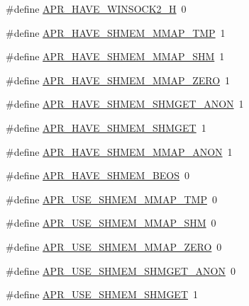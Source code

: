 \begin{DoxyCompactItemize}
\item 
\#define \hyperlink{group__apr__platform_ga46a930f2ecfa34bfa627a8f18532bceb}{A\+P\+R\+\_\+\+H\+A\+V\+E\+\_\+\+W\+I\+N\+S\+O\+C\+K2\+\_\+H}~0
\item 
\#define \hyperlink{group__apr__platform_gaac072bb1db885925d1d426a1650aee18}{A\+P\+R\+\_\+\+H\+A\+V\+E\+\_\+\+S\+H\+M\+E\+M\+\_\+\+M\+M\+A\+P\+\_\+\+T\+MP}~1
\item 
\#define \hyperlink{group__apr__platform_gaae95d5ab380a1519c849b3f54f53dbdb}{A\+P\+R\+\_\+\+H\+A\+V\+E\+\_\+\+S\+H\+M\+E\+M\+\_\+\+M\+M\+A\+P\+\_\+\+S\+HM}~1
\item 
\#define \hyperlink{group__apr__platform_gae77c5864ac1e978b5cdc4613efe874b9}{A\+P\+R\+\_\+\+H\+A\+V\+E\+\_\+\+S\+H\+M\+E\+M\+\_\+\+M\+M\+A\+P\+\_\+\+Z\+E\+RO}~1
\item 
\#define \hyperlink{group__apr__platform_ga3c0e8fc59b8891eeacac290bca9df09b}{A\+P\+R\+\_\+\+H\+A\+V\+E\+\_\+\+S\+H\+M\+E\+M\+\_\+\+S\+H\+M\+G\+E\+T\+\_\+\+A\+N\+ON}~1
\item 
\#define \hyperlink{group__apr__platform_ga35d1fadddb8c1e83a5548946d169da2a}{A\+P\+R\+\_\+\+H\+A\+V\+E\+\_\+\+S\+H\+M\+E\+M\+\_\+\+S\+H\+M\+G\+ET}~1
\item 
\#define \hyperlink{group__apr__platform_ga8237055d9f5700fdccfd173da26ff614}{A\+P\+R\+\_\+\+H\+A\+V\+E\+\_\+\+S\+H\+M\+E\+M\+\_\+\+M\+M\+A\+P\+\_\+\+A\+N\+ON}~1
\item 
\#define \hyperlink{group__apr__platform_ga158aa4bb703689e01adced53d16ae503}{A\+P\+R\+\_\+\+H\+A\+V\+E\+\_\+\+S\+H\+M\+E\+M\+\_\+\+B\+E\+OS}~0
\item 
\#define \hyperlink{group__apr__platform_ga165e27e6100d65b6893d1c9b7e808536}{A\+P\+R\+\_\+\+U\+S\+E\+\_\+\+S\+H\+M\+E\+M\+\_\+\+M\+M\+A\+P\+\_\+\+T\+MP}~0
\item 
\#define \hyperlink{group__apr__platform_ga38ed6a0607f8fbbe977843d84c42b02a}{A\+P\+R\+\_\+\+U\+S\+E\+\_\+\+S\+H\+M\+E\+M\+\_\+\+M\+M\+A\+P\+\_\+\+S\+HM}~0
\item 
\#define \hyperlink{group__apr__platform_gad75204199cfa3631263fb1f1ea8abc94}{A\+P\+R\+\_\+\+U\+S\+E\+\_\+\+S\+H\+M\+E\+M\+\_\+\+M\+M\+A\+P\+\_\+\+Z\+E\+RO}~0
\item 
\#define \hyperlink{group__apr__platform_gaeaedd6e1272ded14f16701b96a3ad14c}{A\+P\+R\+\_\+\+U\+S\+E\+\_\+\+S\+H\+M\+E\+M\+\_\+\+S\+H\+M\+G\+E\+T\+\_\+\+A\+N\+ON}~0
\item 
\#define \hyperlink{group__apr__platform_ga04fb6b9c97e668cef00645dd05c45079}{A\+P\+R\+\_\+\+U\+S\+E\+\_\+\+S\+H\+M\+E\+M\+\_\+\+S\+H\+M\+G\+ET}~1

\end{DoxyCompactItemize}
